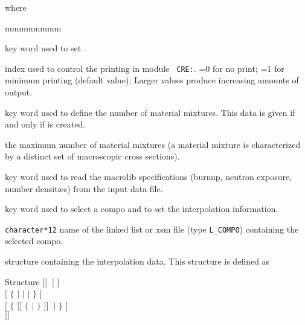 \goodbreak
\noindent where
\begin{ListeDeDescription}{mmmmmmmm}

\item[\moc{EDIT}] key word used to set .

\item[\dusa{iprint}] index used to control the printing in module {\tt
CRE:}. =0 for no print; =1 for minimum printing (default value); Larger values produce increasing amounts of output.

\item[\moc{NMIX}] key word used to define the number of material mixtures. This data is given if and only if  is created.

\item[\dusa{nmixt}] the maximum number of material mixtures (a material mixture is characterized by a distinct set of macroscopic cross sections). 

\item[\moc{READ}] key word used to read the {\sc macrolib} specifications (burnup, neutron exposure, number densities) from the input data file.

\item[\moc{COMPO}] key word used to select a {\sc compo} and to set the interpolation information.

\item[\dusa{NAME2}] {\tt character*12} name of the linked list or {\sc xsm} file (type {\tt L\_COMPO}) containing the selected {\sc compo}.

\item[\dstr{interp\_data}] structure containing the interpolation data. This structure is defined as
\end{ListeDeDescription}

\begin{DataStructure}{Structure }
$[[$   $~[$  $]$ \\
$[$ $\{$   $|$   $|$    $|$    $\}$ $]$ \\
$[$  $\{$ $[[$   $\{$  $|$ \moc{*} $\}$ $]]~$ $|$  $\}$ $]$ \\
 $]]$
\end{DataStructure}

